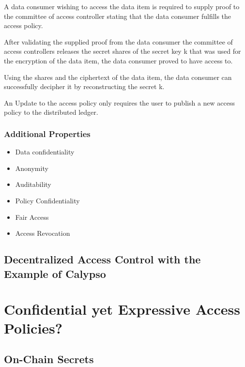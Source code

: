 \documentclass[conference]{IEEEtran}
\begin{document}
A data consumer wishing to access the data item is required to supply proof to the committee of access controller stating that the data consumer fulfills the access policy.

After validating the supplied proof from the data consumer the committee of access controllers releases the secret shares of the secret key k that was used for the encryption of the data item, the data consumer proved to have access to.

Using the shares and the ciphertext of the data item, the data consumer can successfully decipher it by reconstructing the secret k.

An Update to the access policy only requires the user to publish a new access policy to the distributed ledger.

\subsubsection{Additional Properties}
\begin{itemize}
  \item Data confidentiality
  \item Anonymity
  \item Auditability
  \item Policy Confidentiality
  \item Fair Access
  \item Access Revocation
\end{itemize}

\subsection{Decentralized Access Control with the Example of Calypso}

\section{Confidential yet Expressive Access Policies?}

\subsection{On-Chain Secrets}




\end{document}
